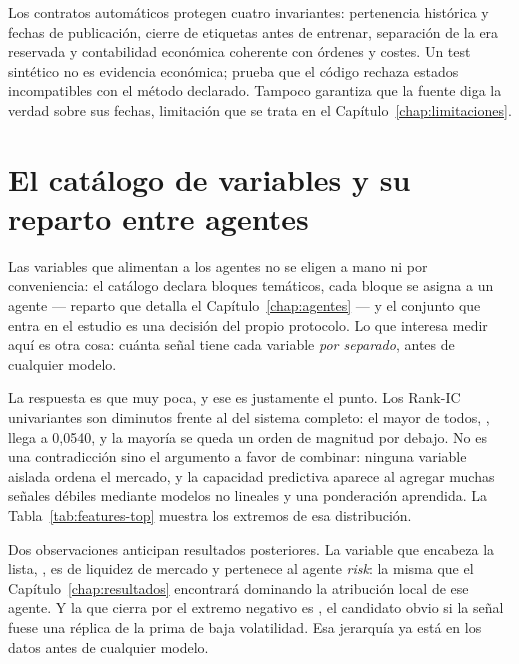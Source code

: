 Los contratos automáticos protegen cuatro invariantes: pertenencia histórica y fechas de
publicación, cierre de etiquetas antes de entrenar, separación de la era reservada y contabilidad
económica coherente con órdenes y costes. Un test sintético no es evidencia económica; prueba que el
código rechaza estados incompatibles con el método declarado. Tampoco garantiza que la fuente diga
la verdad sobre sus fechas, limitación que se trata en el Capítulo~\ref{chap:limitaciones}.

\section{El catálogo de variables y su reparto entre agentes}

Las variables que alimentan a los agentes no se eligen a mano ni por conveniencia: el catálogo
declara bloques temáticos, cada bloque se asigna a un agente --- reparto que detalla el
Capítulo~\ref{chap:agentes} --- y el conjunto que entra en el estudio es una decisión del propio
protocolo. Lo que interesa medir aquí es otra cosa: cuánta señal tiene cada variable
\emph{por separado}, antes de cualquier modelo.

La respuesta es que muy poca, y ese es justamente el punto. Los Rank-IC univariantes son diminutos
frente al \RankICSeleccion{} del sistema completo: el mayor de todos, , llega a 0,0540, y la
mayoría se queda un orden de magnitud por debajo. No es una contradicción sino el argumento a favor
de combinar: ninguna variable aislada ordena el mercado, y la capacidad predictiva aparece al
agregar muchas señales débiles mediante modelos no lineales y una ponderación aprendida. La
Tabla~\ref{tab:features-top} muestra los extremos de esa distribución.

\begin{table}[H]
  \centering
  \small
  \caption{Variables con mayor y menor Rank-IC univariante.}
  \label{tab:features-top}
  
  \caption*{Doce primeras y cinco últimas de las \NumDiagnosticos{} variables con diagnóstico,
  ordenadas por Rank-IC univariante. Los diagnósticos cubren \NumDiagnosticos{} variables frente a
  las \NumPredictores{} que declara el catálogo,
  porque añaden componentes derivados de otras; y ninguna aparece marcada como podada, de modo que la
  tabla describe el catálogo declarado y no qué variables sobrevivieron a la poda por estabilidad.}
\end{table}

Dos observaciones anticipan resultados posteriores. La variable que encabeza la lista,
, es de liquidez de mercado y pertenece al agente \textit{risk}: la misma que el
Capítulo~\ref{chap:resultados} encontrará dominando la atribución local de ese agente. Y la que
cierra por el extremo negativo es , el candidato obvio si la señal fuese una
réplica de la prima de baja volatilidad. Esa jerarquía ya está en los datos antes de cualquier
modelo.
